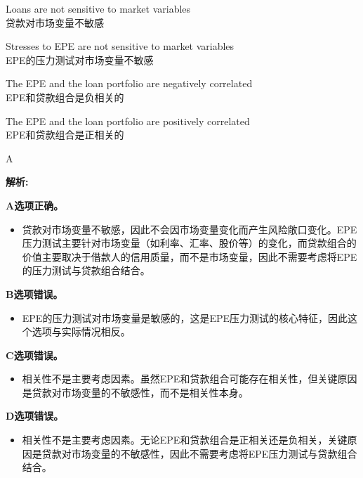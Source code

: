 \documentclass{article}
\newenvironment{explanation}
{\textbf{解析:}\par}
{\par}
\begin{document}
\begin{choices}
    \item Loans are not sensitive to market variables\\
    贷款对市场变量不敏感
    \item Stresses to EPE are not sensitive to market variables\\
    EPE的压力测试对市场变量不敏感
    \item The EPE and the loan portfolio are negatively correlated\\
    EPE和贷款组合是负相关的
    \item The EPE and the loan portfolio are positively correlated\\
    EPE和贷款组合是正相关的
\end{choices}

\begin{correctanswer}
    A
\end{correctanswer}

\begin{explanation}
    \textbf{A选项正确。}
    \begin{itemize}
        \item 贷款对市场变量不敏感，因此不会因市场变量变化而产生风险敞口变化。EPE压力测试主要针对市场变量（如利率、汇率、股价等）的变化，而贷款组合的价值主要取决于借款人的信用质量，而不是市场变量，因此不需要考虑将EPE的压力测试与贷款组合结合。
    \end{itemize}

    \textbf{B选项错误。}
    \begin{itemize}
        \item EPE的压力测试对市场变量是敏感的，这是EPE压力测试的核心特征，因此这个选项与实际情况相反。
    \end{itemize}

    \textbf{C选项错误。}
    \begin{itemize}
        \item 相关性不是主要考虑因素。虽然EPE和贷款组合可能存在相关性，但关键原因是贷款对市场变量的不敏感性，而不是相关性本身。
    \end{itemize}

    \textbf{D选项错误。}
    \begin{itemize}
        \item 相关性不是主要考虑因素。无论EPE和贷款组合是正相关还是负相关，关键原因是贷款对市场变量的不敏感性，因此不需要考虑将EPE压力测试与贷款组合结合。
    \end{itemize}
\end{explanation}
\end{document}
